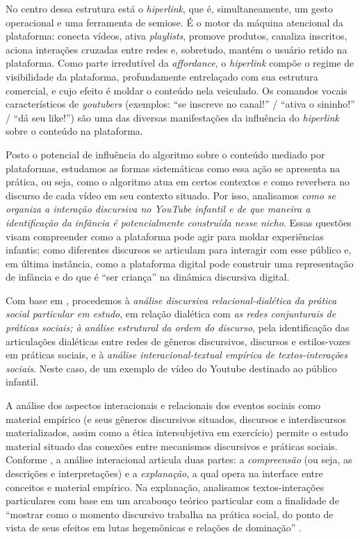 \documentclass[portuguese]{textolivre}
\begin{document}
No centro dessa estrutura está o \textit{hiperlink}, que é, simultaneamente, um gesto operacional e uma ferramenta de semiose. É o motor da máquina atencional da plataforma: conecta vídeos, ativa \textit{playlists}, promove produtos, canaliza inscritos, aciona interações cruzadas entre redes e, sobretudo, mantém o usuário retido na plataforma. Como parte irredutível da \textit{affordance}, o \textit{hiperlink} compõe o regime de visibilidade da plataforma, profundamente entrelaçado com sua estrutura comercial, e cujo efeito é moldar o conteúdo nela veiculado. Os comandos vocais característicos de \textit{youtubers} (exemplos: “se inscreve no canal!” / “ativa o sininho!” / “dá seu like!”) são uma das diversas manifestações da influência do \textit{hiperlink} sobre o conteúdo na plataforma.

Posto o potencial de influência do algoritmo sobre o conteúdo mediado por plataformas, estudamos as formas sistemáticas como essa ação se apresenta na prática, ou seja, como o algoritmo atua em certos contextos e como reverbera no discurso de cada vídeo em seu contexto situado. Por isso, analisamos \textit{como se organiza a interação discursiva no YouTube infantil e de que maneira a identificação da infância é potencialmente construída nesse nicho}. Essas questões visam compreender como a plataforma pode agir para moldar experiências infantis; como diferentes discursos se articulam para interagir com esse público e, em última instância, como a plataforma digital pode construir uma representação de infância e do que é “ser criança” na dinâmica discursiva digital.

Com base em \textcite[p. 105]{Vieira2024Decolonial}, procedemos à \textit{análise discursiva relacional-dialética da prática social particular em estudo}, em relação dialética com \textit{as redes conjunturais de práticas sociais; à análise estrutural da ordem do discurso}, pela identificação das articulações dialéticas entre redes de gêneros discursivos, discursos e estilos-vozes em práticas sociais, e à \textit{análise interacional-textual empírica de textos-interações sociais}. Neste caso, de um exemplo de vídeo do Youtube destinado ao público infantil.

A análise dos aspectos interacionais e relacionais dos eventos sociais como material empírico (e seus gêneros discursivos situados, discursos e interdiscursos materializados, assim como a ética intersubjetiva em exercício) permite o estudo material situado das conexões entre mecanismos discursivos e práticas sociais. Conforme \textcite{ChouliarakiFairclough1999DiscourseLateModernity}, a análise interacional articula duas partes: a \textit{compreensão} (ou seja, as descrições e interpretações) e a \textit{explanação}, a qual opera na interface entre conceitos e material empírico. Na explanação, analisamos textos-interações particulares com base em um arcabouço teórico particular com a finalidade de “mostrar como o momento discursivo trabalha na prática social, do ponto de vista de seus efeitos em lutas hegemônicas e relações de dominação” \cite[p. 67]{ChouliarakiFairclough1999DiscourseLateModernity}.
\end{document}
